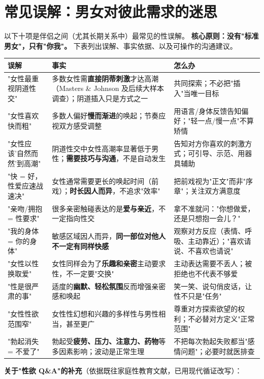 \documentclass[12pt,UTF8,openany]{ctexbook}
\begin{document}
\section{常见误解：男女对彼此需求的迷思}

以下十项是伴侣之间（尤其长期关系中）最常见的性误解。
\textbf{核心原则：没有"标准男女"，只有"你我"。}
下表列出误解、事实依据、以及可操作的沟通建议。

\begin{tabularx}{\textwidth}{@{}l X X@{}}
\toprule
\textbf{误解} & \textbf{事实} & \textbf{怎么办} \\
\midrule
"女性最重视阴道性交" & 多数女性需\textbf{直接阴蒂刺激}才达高潮（Masters \& Johnson 及后续大样本调查）；阴道插入只是方式之一 & 共同探索；不必把"插入"当唯一目标 \\
"女性喜欢快而粗" & 多数人偏好\textbf{慢而渐进}的唤起；节奏应视双方感受调整 & 用语言/身体反馈告知偏好；"轻一点/慢一点"不算矫情 \\
"女性应该'自然而然'到高潮" & 阴道性交中女性高潮率显著低于男性；\textbf{需要技巧与沟通}，不是自动发生 & 告知对方你喜欢的刺激方式；可引导、示范、用器具辅助 \\
"快 = 好，性爱应速战速决" & 女性通常需要更长的唤起时间（前戏）；\textbf{时长因人而异}，不追求"效率" & 把前戏视为"正文"而非"序章"；关注双方满意度 \\
"亲吻/拥抱 = 性要求" & 很多亲密触碰表达的是\textbf{爱与亲近}，不一定指向性交 & 拿不准就问："你想做爱，还是只想抱一会儿？" \\
"我的身体 = 你的身体" & 敏感区域因人而异，\textbf{同一部位对他人不一定有同样快感} & 观察对方反应（表情、呼吸、主动靠近）；"喜欢请说、不喜欢也请说" \\
"女性以性换取爱" & 女性同样会为了\textbf{乐趣和亲密}主动要求性，不一定要"交换" & 主动表达需要不丢人；被拒绝也不代表不够爱 \\
"性是很严肃的事" & 适度的\textbf{幽默、轻松氛围}反而增强亲密感和唤起 & 笑一笑、说句俏皮话，让性不只是"任务" \\
"女性性欲范围窄" & 女性性幻想和兴趣的多样性与男性相当，甚至更广 & 尊重对方探索欲望的权利；不必替对方定义"正常范围" \\
"勃起消失 = 不爱了" & 勃起受\textbf{疲劳、压力、注意力、药物}等多因素影响；波动是正常生理 & 不把每次勃起失败都当"感情问题"；必要时就医排查 \\
\bottomrule
\end{tabularx}

\vspace{1em}
\noindent\textbf{关于"性欲 Q\&A"的补充}（依据既往家庭性教育文献，已用现代循证改写）：
\end{document}

